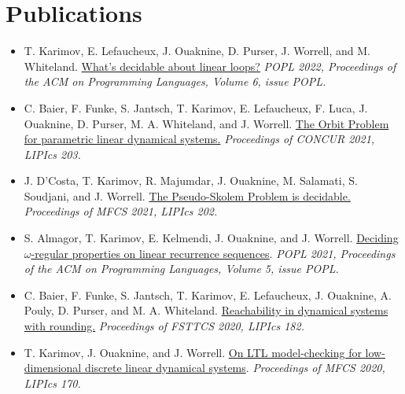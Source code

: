 \documentclass{article}
\begin{document}
	\section*{Publications}
	\begin{itemize}
		\item T. Karimov, E. Lefaucheux, J. Ouaknine, D. Purser, J. Worrell, and M. Whiteland. 
		\newline \href{https://dl.acm.org/doi/10.1145/3498727}{What's decidable about linear loops?}
		\newline\emph{POPL 2022, Proceedings of the ACM on Programming Languages, Volume 6, issue POPL.}
		
		\item C. Baier, F. Funke, S. Jantsch, T. Karimov, E. Lefaucheux, F. Luca, J. Ouaknine, D. Purser, M. A. Whiteland, and J. Worrell.
		\newline \href{https://people.mpi-sws.org/~joel/publications/semialgebraic-model-checking-LDS21abs.html}{The Orbit Problem for parametric linear dynamical systems.}
		\newline \emph{Proceedings of CONCUR 2021, LIPIcs 203.}
		
		\item J. D'Costa, T. Karimov, R. Majumdar, J. Ouaknine, M. Salamati, S. Soudjani, and J. Worrell.
		\newline \href{https://people.mpi-sws.org/~joel/publications/pseudo-skolem21abs.html}{The Pseudo-Skolem Problem is decidable.}
		\newline \emph{Proceedings of MFCS 2021, LIPIcs 202.}
		
		\item S. Almagor, T. Karimov, E. Kelmendi, J. Ouaknine, and J. Worrell.
		\newline \href{https://people.mpi-sws.org/~joel/publications/omega_LRS21abs.html}{Deciding $\omega$-regular properties on linear recurrence sequences}. 
		\newline
		\emph{POPL 2021, Proceedings of the ACM on Programming Languages, Volume 5, issue POPL.}
		
		\item C. Baier, F. Funke, S. Jantsch, T. Karimov, E. Lefaucheux, J. Ouaknine,
		A. Pouly, D. Purser, and M. A. Whiteland. 
		\newline
		\href{https://people.mpi-sws.org/~joel/publications/dynamical_systems_orbit_rounding20abs.html}{Reachability in dynamical systems with rounding.} 
		\newline \emph{Proceedings of FSTTCS 2020, LIPIcs 182.}
		
		\item T. Karimov, J. Ouaknine, and J. Worrell. 
		\newline \href{https://people.mpi-sws.org/~joel/publications/LTL_discrete_LDS20abs.html}{On LTL model-checking for low-dimensional discrete
		linear dynamical systems}. \newline \emph{Proceedings of MFCS 2020, LIPIcs 170.}
	\end{itemize}
\end{document}
